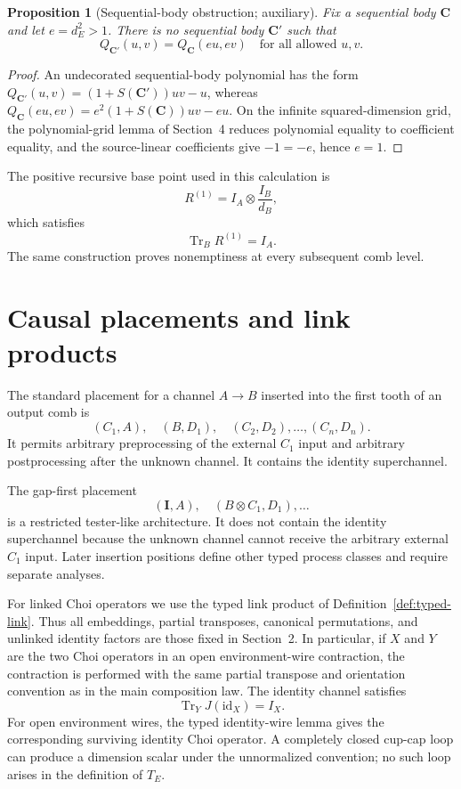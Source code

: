 \documentclass[11pt,a4paper]{article}
\theoremstyle{definition}
\theoremstyle{plain}
\newtheorem{proposition}[theorem]{Proposition}
\theoremstyle{remark}
\DeclareMathOperator{\Tr}{Tr}
\newcommand{\id}{\mathrm{id}}
\begin{document}
\begin{proposition}[Sequential-body obstruction; auxiliary]
Fix a sequential body $\mathbf C$ and let $e=d_E^2>1$. There is no
sequential body $\mathbf C'$ such that
\[
Q_{\mathbf C'}(u,v)=Q_{\mathbf C}(eu,ev)
\quad\text{for all allowed }u,v.
\]
\end{proposition}
\begin{proof}
An undecorated sequential-body polynomial has the form
$Q_{\mathbf C'}(u,v)=(1+S(\mathbf C'))uv-u$, whereas
$Q_{\mathbf C}(eu,ev)=e^2(1+S(\mathbf C))uv-eu$. On the infinite
squared-dimension grid, the polynomial-grid lemma of Section~4 reduces
polynomial equality to coefficient equality, and the source-linear
coefficients give $-1=-e$, hence $e=1$.
\end{proof}

The positive recursive base point used in this calculation is
\[
R^{(1)}=I_A\otimes\frac{I_B}{d_B},
\]
which satisfies
\[
\Tr_B R^{(1)}=I_A.
\]
The same construction proves nonemptiness at every subsequent comb level.

\section{Causal placements and link products}
\label{app:placements}

The standard placement for a channel $A\to B$ inserted into the first tooth of an output comb is
\[
(C_1,A),\quad(B,D_1),\quad(C_2,D_2),\ldots,(C_n,D_n).
\]
It permits arbitrary preprocessing of the external $C_1$ input and arbitrary postprocessing after the unknown channel. It contains the identity superchannel.

The gap-first placement
\[
(\mathbf I,A),\quad(B\otimes C_1,D_1),\ldots
\]
is a restricted tester-like architecture. It does not contain the identity superchannel because the unknown channel cannot receive the arbitrary external $C_1$ input. Later insertion positions define other typed process classes and require separate analyses.

For linked Choi operators we use the typed link product of
Definition~\ref{def:typed-link}. Thus all embeddings, partial transposes,
canonical permutations, and unlinked identity factors are those fixed in
Section~2. In particular, if $X$ and $Y$ are the two Choi operators in an
open environment-wire contraction, the contraction is performed with the
same partial transpose and orientation convention as in the main
composition law. The identity channel satisfies
\[
\Tr_YJ(\id_X)=I_X.
\]
For open environment wires, the typed identity-wire lemma gives the
corresponding surviving identity Choi operator. A completely closed
cup-cap loop can produce a dimension scalar under the unnormalized
convention; no such loop arises in the definition of $T_E$.
\end{document}
